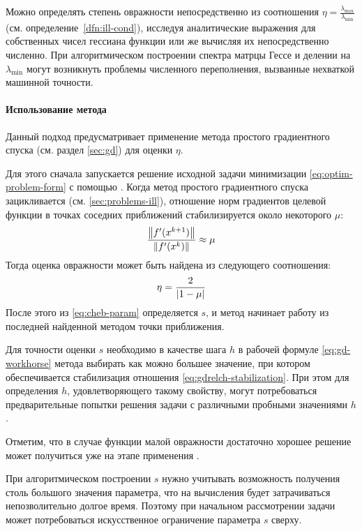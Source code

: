 Можно определять степень овражности непосредственно из соотношения
$\eta=\frac{\lambda_{\max}}{\lambda_{\min}}$ (см.
определение \ref{dfn:ill-cond}), исследуя аналитические выражения для
собственных чисел гессиана функции или же вычисляя их непосредственно
численно. При алгоритмическом построении спектра матрцы Гессе и
делении на $\lambda_{\min}$ могут возникнуть проблемы численного
переполнения, вызванные нехваткой машинной точности.

\paragraph{Использование метода \gd{}}

Данный подход предусматривает применение метода простого градиентного
спуска (см. раздел \ref{sec:gd}) для оценки $\eta$. 

Для этого сначала запускается решение исходной задачи минимизации
\eqref{eq:optim-problem-form} с помощью \gd{}. Когда метод простого
градиентного спуска зацикливается (см. \ref{sec:problems-ill}),
отношение норм градиентов целевой функции в точках соседних
приближений стабилизируется около некоторого $\mu$:
\begin{equation}
  \label{eq:gdrelch-stabilization}
  \frac{\left \lVert{f'(x^{k+1})}\right \rVert}{\left \lVert{f'(x^k)}\right \rVert} \approx \mu
\end{equation}
Тогда оценка овражности может быть найдена из следующего
соотношения:
\begin{equation*}
  \eta = \frac{2}{\left \lvert{1-\mu}\right \rvert}
\end{equation*}
После этого из \eqref{eq:cheb-param} определяется $s$, и метод
\relch{} начинает работу из последней найденной методом \gd{} точки
приближения.

Для точности оценки $s$ необходимо в качестве шага $h$ в рабочей
формуле \eqref{eq:gd-workhorse} метода \gd{} выбирать как можно
большее значение, при котором обеспечивается стабилизация отношения
\eqref{eq:gdrelch-stabilization}. При этом для определения $h$,
удовлетворяющего такому свойству, могут потребоваться предварительные
попытки решения задачи с различными пробными значениями $h$.

Отметим, что в случае функции малой овражности достаточно хорошее
решение может получиться уже на этапе применения \gd{}.

При алгоритмическом построении $s$ нужно учитывать возможность
получения столь большого значения параметра, что на вычисления будет
затрачиваться непозволительно долгое время. Поэтому при начальном
рассмотрении задачи может потребоваться искусственное ограничение
параметра $s$ сверху.

